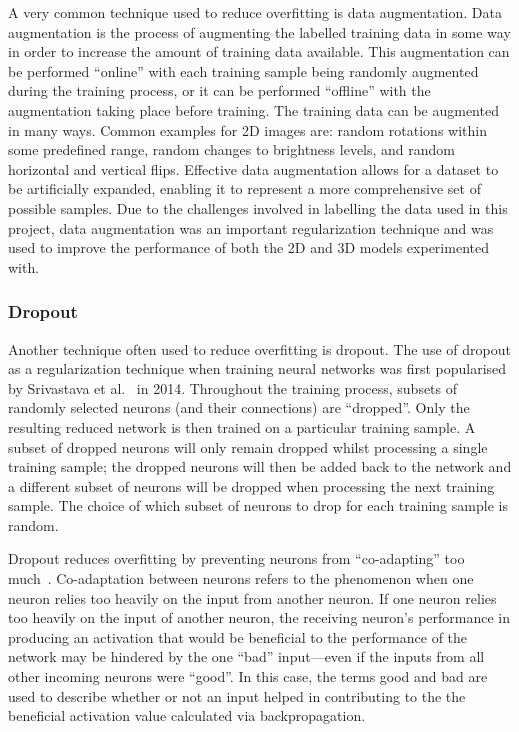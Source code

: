 A very common technique used to reduce overfitting is data augmentation. Data augmentation is the process of augmenting the labelled training data in some way in order to increase the amount of training data available. This augmentation can be performed ``online'' with each training sample being randomly augmented during the training process, or it can be performed ``offline'' with the augmentation taking place before training. The training data can be augmented in many ways. Common examples for 2D images are: random rotations within some predefined range, random changes to brightness levels, and random horizontal and vertical flips. Effective data augmentation allows for a dataset to be artificially expanded, enabling it to represent a more comprehensive set of possible samples. Due to the challenges involved in labelling the data used in this project, data augmentation was an important regularization technique and was used to improve the performance of both the 2D and 3D models experimented with.

\subsubsection{Dropout}

Another technique often used to reduce overfitting is dropout. The use of dropout as a regularization technique when training neural networks was first popularised by Srivastava et al.~\cite{dropout} in 2014. Throughout the training process, subsets of randomly selected neurons (and their connections) are ``dropped''. Only the resulting reduced network is then trained on a particular training sample. A subset of dropped neurons will only remain dropped whilst processing a single training sample; the dropped neurons will then be added back to the network and a different subset of neurons will be dropped when processing the next training sample. The choice of which subset of neurons to drop for each training sample is random. 

Dropout reduces overfitting by preventing neurons from ``co-adapting'' too much~\cite{dropout}. Co-adaptation between neurons refers to the phenomenon when one neuron relies too heavily on the input from another neuron. If one neuron relies too heavily on the input of another neuron, the receiving neuron's performance in producing an activation that would be beneficial to the performance of the network may be hindered by the one ``bad'' input---even if the inputs from all other incoming neurons were ``good''. In this case, the terms good and bad are used to describe whether or not an input helped in contributing to the the beneficial activation value calculated via backpropagation.

